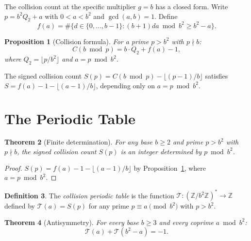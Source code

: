 \documentclass[12pt]{amsart}
\newtheorem{theorem}{Theorem}[section]
\newtheorem{proposition}[theorem]{Proposition}
\theoremstyle{definition}
\newtheorem{definition}[theorem]{Definition}
\theoremstyle{remark}
\begin{document}
The collision count at the specific multiplier $g = b$ has a
closed form. Write $p = b^2 Q_2 + a$ with
$0 < a < b^2$ and $\gcd(a, b) = 1$. Define
\begin{equation}\label{eq:f}
f(a) = \#\{d \in \{0, \ldots, b{-}1\} :
(b{+}1)da \bmod b^2 \ge b^2 - a\}.
\end{equation}

\begin{proposition}[Collision formula]\label{prop:formula}
For a prime $p > b^2$ with $p \nmid b$:
\[
C(b \bmod p) = b \cdot Q_2 + f(a) - 1,
\]
where $Q_2 = \lfloor p / b^2 \rfloor$ and $a = p \bmod b^2$.
\end{proposition}

The signed collision count
$S(p) = C(b \bmod p) - \lfloor(p{-}1)/b\rfloor$
satisfies $S = f(a) - 1 - \lfloor(a{-}1)/b\rfloor$, depending
only on $a = p \bmod b^2$.

\section{The Periodic Table}

\begin{theorem}[Finite determination]\label{thm:fingerprint}
For any base $b \ge 2$ and prime $p > b^2$ with $p \nmid b$,
the signed collision count $S(p)$ is an integer determined by
$p \bmod b^2$.
\end{theorem}

\begin{proof}
$S(p) = f(a) - 1 - \lfloor(a{-}1)/b\rfloor$ by
Proposition~\ref{prop:formula}, where $a = p \bmod b^2$.
\end{proof}

\begin{definition}
The \emph{collision periodic table} is the function
$\mathcal{T} \colon (\mathbb{Z}/b^2\mathbb{Z})^{*}
\to \mathbb{Z}$ defined by $\mathcal{T}(a) = S(p)$ for
any prime $p \equiv a \pmod{b^2}$ with $p > b^2$.
\end{definition}

\begin{theorem}[Antisymmetry]\label{thm:antisym}
For every base $b \ge 3$ and every coprime $a \bmod b^2$:
\[
\mathcal{T}(a) + \mathcal{T}(b^2 - a) = -1.
\]
\end{theorem}
\end{document}
